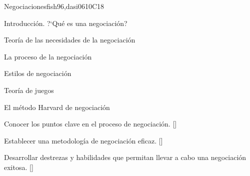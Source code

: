 \begin{syllabus}
\begin{unit}{}{Negociaciones}{fish96,dasi06}{10}{C18}
\begin{topics}
      \item Introducción. ?`Qué es una negociación?
      \item Teoría de las necesidades de la negociación
      \item La proceso de la negociación
      \item Estilos de negociación
      \item Teoría de juegos
      \item El método Harvard de negociación
   \end{topics}
   \begin{learningoutcomes}
      \item Conocer los puntos clave en el proceso de negociación. [\Usage]
      \item Establecer una metodología de negociación eficaz. [\Usage]
      \item Desarrollar destrezas y habilidades que permitan llevar a cabo una negociación exitosa. [\Usage]
   \end{learningoutcomes}
\end{unit}





\begin{coursebibliography}
\end{coursebibliography}

\end{syllabus}

%
